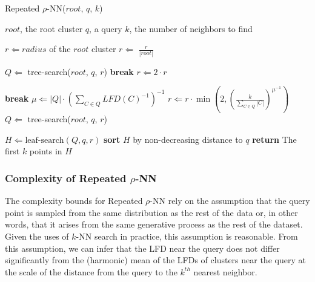 \begin{algorithm}\small %
    \caption{Repeated $\rho$-NN($root$, $q$, $k$)} %
    \label{alg:methods:repeated-rnn} %
    \begin{algorithmic} %
        \Require $root$, the root cluster
        \Require $q$, a query
        \Require $k$, the number of neighbors to find

        \State $r \Leftarrow radius$ of the $root$ cluster
        \State $r \Leftarrow$ $\frac{r}{|root|}$

        \Loop
            \State $Q \Leftarrow$ tree-search($root$, $q$, $r$)
                \State \textbf{break}
            \EndIf
            \State $r \Leftarrow 2 \cdot r$
        \EndLoop

        \Loop
                \State \textbf{break}
            \EndIf
            \State $\mu \Leftarrow |Q| \cdot \left( \sum_{C \in Q} LFD(C)^{-1} \right)^{-1}$
            \State $r \Leftarrow r \cdot \min \left( 2, \left( {\frac{k}{\sum_{C \in Q} |C|}} \right)^{\mu^{-1}} \right)$
            \State $Q \Leftarrow$ tree-search($root$, $q$, $r$)
        \EndLoop

        \State $H \Leftarrow \text{leaf-search}(Q, q, r)$
        \State \textbf{sort} $H$ by non-decreasing distance to $q$
        \State \textbf{return} The first $k$ points in $H$
    \end{algorithmic}
\end{algorithm}


\subsubsection{Complexity of Repeated \texorpdfstring{$\rho$}{p}-NN}
\label{sec:methods:knn-search:repeated-rnn-complexity}

The complexity bounds for Repeated $\rho$-NN rely on the assumption that the query point is sampled from the same distribution as the rest of the data or, in other words, that it arises from the same generative process as the rest of the dataset.
Given the uses of $k$-NN search in practice, this assumption is reasonable.
From this assumption, we can infer that the LFD near the query does not differ significantly from the (harmonic) mean of the LFDs of clusters near the query at the scale of the distance from the query to the $k^{th}$ nearest neighbor.

